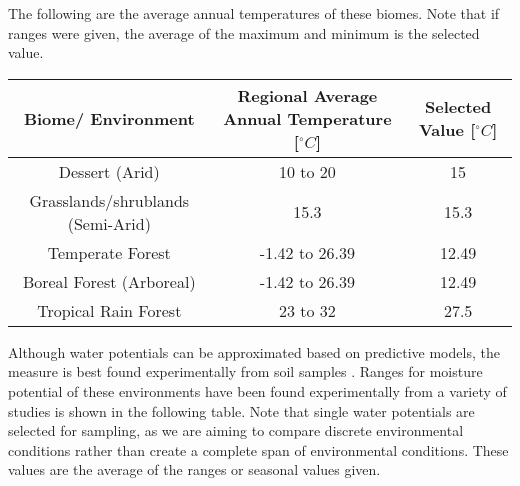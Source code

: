 \documentclass[12pt]{article}
\begin{document}
\pagebreak
The following are the average annual temperatures of these biomes. Note that if ranges were given, the average of the maximum and minimum is the selected value.

\begin{table}[H]
	\begin{center}
		\begin{tabular}{|c c c|} 
			\hline
			Biome/ Environment & Regional Average Annual Temperature [$^{\circ}C$] & Selected Value [$^{\circ}C$]\\ [0.5ex] 
			\hline\hline
			Dessert (Arid) & 10 to 20 \cite{Davey2007} & 15 \\ 
			\hline
			Grasslands/shrublands (Semi-Arid) & 15.3 \cite{Pelaez1994} & 15.3 \\
			\hline
			Temperate Forest & -1.42 to 26.39 \cite{Zaz2019} & 12.49 \\
			\hline
			Boreal Forest (Arboreal)& -1.42 to 26.39 \cite{Zaz2019} & 12.49 \\
			\hline
			Tropical Rain Forest & 23 to 32 \cite{Paton2019} &27.5 \\
			\hline
		\end{tabular}
	\end{center}
\end{table}

Although water potentials can be approximated based on predictive models, the measure is best found experimentally from soil samples \cite{Abkenar2019}. Ranges for moisture potential of these environments have been found experimentally from a variety of studies is shown in the following table. Note that single water potentials are selected for sampling, as we are aiming to compare discrete environmental conditions rather than create a complete span of environmental conditions. These values are the average of the ranges or seasonal values given.
\end{document}

